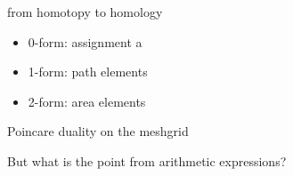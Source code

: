 from homotopy to homology

\begin{itemize}
\item 0-form: assignment a
\item 1-form: path elements
\item 2-form: area elements
\end{itemize}

Poincare duality on the meshgrid

But what is the point from arithmetic expressions?
